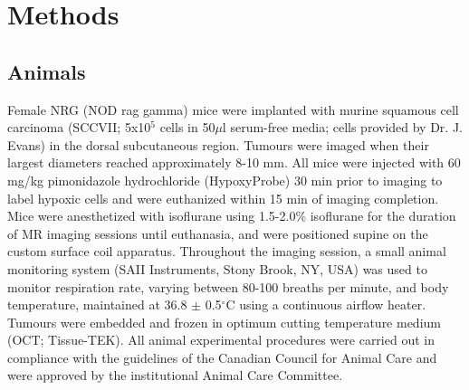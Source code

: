 \section{Methods}
\subsection{Animals}
Female NRG (NOD rag gamma) mice were implanted with murine squamous cell carcinoma (SCCVII; 5x10$^5$ cells in 50$\mu$l serum-free media; cells provided by Dr. J. Evans) in the dorsal subcutaneous region.
Tumours were imaged when their largest diameters reached approximately 8-10 mm.
All mice were injected with 60 mg/kg pimonidazole hydrochloride (HypoxyProbe) 30 min prior to imaging to label hypoxic cells and were euthanized within 15 min of imaging completion.
Mice were anesthetized with isoflurane using 1.5-2.0\% isoflurane for the duration of MR imaging sessions until euthanasia, and were positioned supine on the custom surface coil apparatus.
Throughout the imaging session, a small animal monitoring system (SAII Instruments, Stony Brook, NY, USA) was used to monitor respiration rate, varying between 80-100 breaths per minute, and body temperature, maintained at 36.8 $\pm$ 0.5$^\circ$C using a continuous airflow heater. 
Tumours were embedded and frozen in optimum cutting temperature medium (OCT; Tissue-TEK).
All animal experimental procedures were carried out in compliance with the guidelines of the Canadian Council for Animal Care and were approved by the institutional Animal Care Committee.

